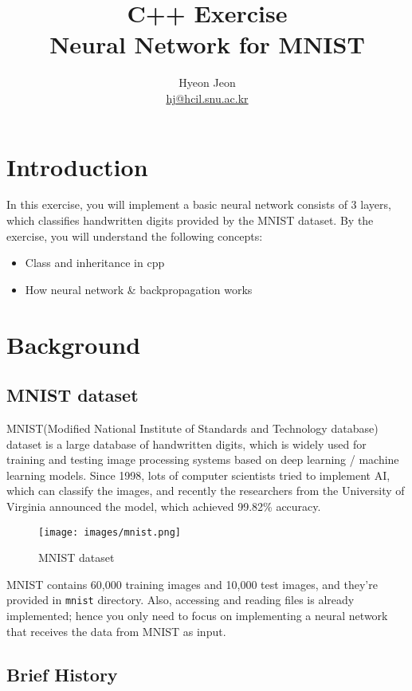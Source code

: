\documentclass{oblivoir}
\title{\vspace{-1cm}C++ Exercise \\ \huge{Neural Network for MNIST}}
\author{Hyeon Jeon \\ \small{\href{hj@hcil.snu.ac.kr}{hj@hcil.snu.ac.kr}}}
\date{}
\begin{document}

\maketitle
\vspace{-1cm}
\section{Introduction}


In this exercise, you will implement a basic neural network consists of 3 layers, which classifies handwritten digits provided by the MNIST dataset. By the exercise, you will understand the following concepts:
\begin{itemize}
    \item Class and inheritance in cpp
    \item How neural network \& backpropagation works
\end{itemize}

\section{Background}

\subsection{MNIST dataset} 

MNIST(Modified National Institute of Standards and Technology database) dataset is a large database of handwritten digits, which is widely used for training and testing image processing systems based on deep learning / machine learning models. Since 1998, lots of computer scientists tried to implement AI, which can classify the images, and recently the researchers from the University of Virginia announced the model, which achieved 99.82\% accuracy.

\begin{figure}[h]
    \centering
    \texttt{[image: images/mnist.png]}
    {\caption*{MNIST dataset}}
\end{figure}

MNIST contains 60,000 training images and 10,000 test images, and they're provided in \texttt{mnist} directory. Also, 
accessing and reading files is already implemented; hence you only need to focus on implementing a neural network that receives the data from MNIST as input. 

\subsection{Brief History}
\end{document}
